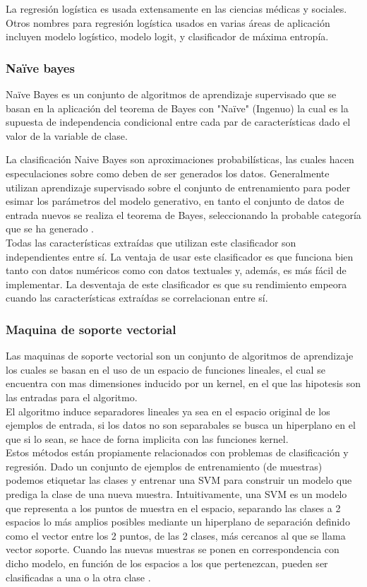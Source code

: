 La regresión logística es usada extensamente en las ciencias médicas y sociales. Otros nombres para regresión logística usados en varias áreas de 
aplicación incluyen modelo logístico, modelo logit, y clasificador de máxima entropía.


\subsubsection{Na{\"i}ve bayes}
Na{\"i}ve Bayes es un conjunto de algoritmos de aprendizaje supervisado que se basan en la aplicación del teorema de Bayes con "Na{\"i}ve" 
(Ingenuo) la cual es la supuesta de independencia condicional entre cada par de características dado el valor de la variable de clase. 

La clasificación Naive Bayes son aproximaciones probabilísticas, las cuales hacen especulaciones sobre como deben de ser 
generados los datos. Generalmente utilizan aprendizaje supervisado sobre el conjunto de entrenamiento para poder esimar los parámetros 
del modelo generativo, en tanto el conjunto de datos de entrada nuevos se realiza el teorema de Bayes, seleccionando la probable categoría 
que se ha generado \cite{CT7}.
\\
Todas las características extraídas que utilizan este clasificador son independientes entre sí. La ventaja de usar este clasificador es que 
funciona bien tanto con datos numéricos como con datos textuales y, además, es más fácil de implementar. La desventaja de este clasificador es 
que su rendimiento empeora cuando las características extraídas se correlacionan entre sí.

\subsubsection{Maquina de soporte vectorial}
Las maquinas de soporte vectorial son un conjunto de algoritmos de aprendizaje los cuales se basan en el uso de un espacio de funciones lineales, 
el cual se encuentra con mas dimensiones inducido por un kernel, en el que las hipotesis son las entradas para el algoritmo. \\
El algoritmo induce separadores lineales ya sea en el espacio original de los ejemplos de entrada, si los datos no son separabales se busca un hiperplano 
en el que si lo sean, se hace de forna implicita con las funciones kernel.\\

Estos métodos están propiamente relacionados con problemas de clasificación y regresión. Dado un conjunto de ejemplos de entrenamiento (de muestras) 
podemos etiquetar las clases y entrenar una SVM para construir un modelo que prediga la clase de una nueva muestra. Intuitivamente, una SVM es un modelo 
que representa a los puntos de muestra en el espacio, separando las clases a 2 espacios lo más amplios posibles mediante un hiperplano de separación definido 
como el vector entre los 2 puntos, de las 2 clases, más cercanos al que se llama vector soporte. Cuando las nuevas muestras se ponen en correspondencia con dicho 
modelo, en función de los espacios a los que pertenezcan, pueden ser clasificadas a una o la otra clase \citep{CT8}.

